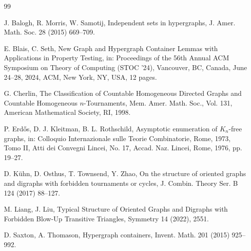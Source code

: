 \documentclass[11pt,a4paper]{article}
\begin{document}
\begin{thebibliography}{99}

J. Balogh, R. Morris, W. Samotij,
Independent sets in hypergraphs,
J. Amer. Math. Soc. 28 (2015) 669–709.

E. Blais, C. Seth,
New Graph and Hypergraph Container Lemmas with Applications in Property Testing,
in: Proceedings of the 56th Annual ACM Symposium on Theory of Computing (STOC '24), Vancouver, BC, Canada, June 24–28, 2024, ACM, New York, NY, USA, 12 pages.

G. Cherlin,
The Classification of Countable Homogeneous Directed Graphs and Countable Homogeneous $n$-Tournaments,
Mem. Amer. Math. Soc., Vol. 131, American Mathematical Society, RI, 1998.

P. Erd\H{o}s, D. J. Kleitman, B. L. Rothschild,
Asymptotic enumeration of $K_n$-free graphs,
in: Colloquio Internazionale sulle Teorie Combinatorie, Rome, 1973, Tomo II,
Atti dei Convegni Lincei, No. 17, Accad. Naz. Lincei, Rome, 1976, pp. 19–27.

D. K{\"u}hn, D. Osthus, T. Townsend, Y. Zhao,
On the structure of oriented graphs and digraphs with forbidden tournaments or cycles,
J. Combin. Theory Ser. B 124 (2017) 88–127.

M. Liang, J. Liu,
Typical Structure of Oriented Graphs and Digraphs with Forbidden Blow-Up Transitive Triangles,
Symmetry 14 (2022), 2551.

D. Saxton, A. Thomason,
Hypergraph containers,
Invent. Math. 201 (2015) 925–992.

\end{thebibliography}
\end{document}

